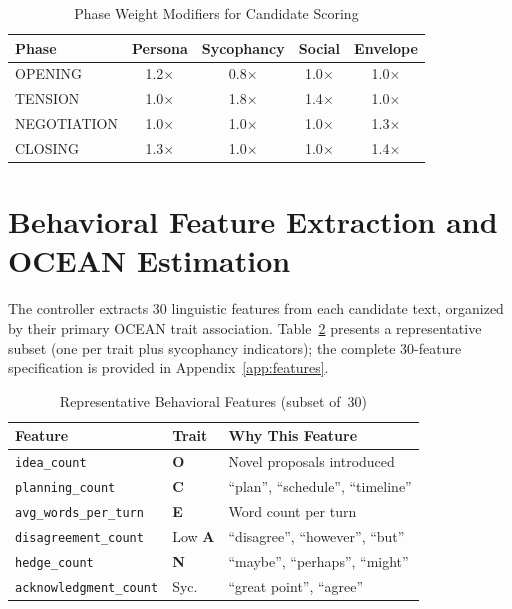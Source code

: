 \begin{table}[t]
\centering
\caption{Phase Weight Modifiers for Candidate Scoring}
\label{tab:phase_weights}
\begin{tabular}{lcccc}
\toprule
Phase & Persona & Sycophancy & Social & Envelope \\
\midrule
OPENING     & 1.2$\times$ & 0.8$\times$ & 1.0$\times$ & 1.0$\times$ \\
TENSION     & 1.0$\times$ & 1.8$\times$ & 1.4$\times$ & 1.0$\times$ \\
NEGOTIATION & 1.0$\times$ & 1.0$\times$ & 1.0$\times$ & 1.3$\times$ \\
CLOSING     & 1.3$\times$ & 1.0$\times$ & 1.0$\times$ & 1.4$\times$ \\
\bottomrule
\end{tabular}
\end{table}


\section{Behavioral Feature Extraction and OCEAN Estimation}

The controller extracts 30 linguistic features from each candidate text, organized by their primary OCEAN trait association. Table~\ref{tab:features} presents a representative subset (one per trait plus sycophancy indicators); the complete 30-feature specification is provided in Appendix~\ref{app:features}.

\begin{table}[t]
\centering
\caption{Representative Behavioral Features (subset of~30)}
\label{tab:features}
\begin{tabular}{p{2.5cm}p{1.5cm}p{6cm}}
\toprule
Feature & Trait & Why This Feature \\
\midrule
\texttt{idea\_count}          & \textbf{O} & Novel proposals introduced \\
\texttt{planning\_count}      & \textbf{C} & ``plan'', ``schedule'', ``timeline'' \\
\texttt{avg\_words\_per\_turn} & \textbf{E} & Word count per turn \\
\texttt{disagreement\_count}  & Low \textbf{A} & ``disagree'', ``however'', ``but'' \\
\texttt{hedge\_count}         & \textbf{N} & ``maybe'', ``perhaps'', ``might'' \\
\texttt{acknowledgment\_count} & Syc. & ``great point'', ``agree'' \\
\bottomrule
\end{tabular}
\end{table}

